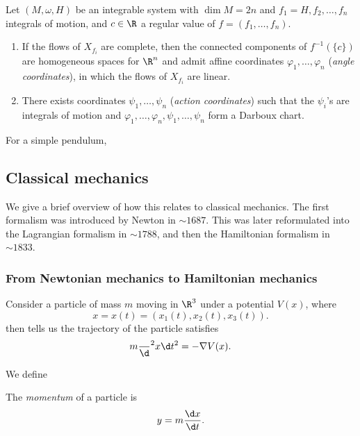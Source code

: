 \documentclass[a4paper]{article}
\begin{document}
\begin{thm}
  Let $(M, \omega, H)$ be an integrable system with $\dim M = 2n$ and $f_1 = H, f_2, \ldots, f_n$ integrals of motion, and $c \in \R$ a regular value of $f = (f_1, \ldots, f_n)$.

  \begin{enumerate}
    \item If the flows of $X_{f_i}$ are complete, then the connected components of $f^{-1}(\{c\})$ are homogeneous spaces for $\R^n$ and admit affine coordinates $\varphi_1, \ldots, \varphi_n$  (\emph{angle coordinates}), in which the flows of $X_{f_i}$ are linear.
    \item There exists coordinates $\psi_1,  \ldots, \psi_n$ (\emph{action coordinates}) such that the $\psi_i$'s are integrals of motion and $\varphi_1, \ldots, \varphi_n, \psi_1, \ldots, \psi_n$ form a Darboux chart. 
  \end{enumerate}
\end{thm}

\begin{eg}
  For a simple pendulum, %
\end{eg}

\subsection{Classical mechanics}
We give a brief overview of how this relates to classical mechanics. The first formalism was introduced by Newton in $\sim 1687$. This was later reformulated into the Lagrangian formalism in $\sim 1788$, and then the Hamiltonian formalism in $\sim 1833$.

\subsubsection*{From Newtonian mechanics to Hamiltonian mechanics}
\begin{eg}
  Consider a particle of mass $m$ moving in $\R^3$ under a potential $V(x)$, where
  \[
    x = x(t) = (x_1(t), x_2(t), x_3(t)).
  \]
   then tells us the trajectory of the particle satisfies
  \[
    m\frac{}\d^2 x{\d t^2} = - \nabla V(x).
  \]
\end{eg}
We define
\begin{defi}[Momentum]
  The \emph{momentum} of a particle is
  \[
    y = m \frac{\d x}{\d t}.
  \]
\end{defi}
\end{document}
